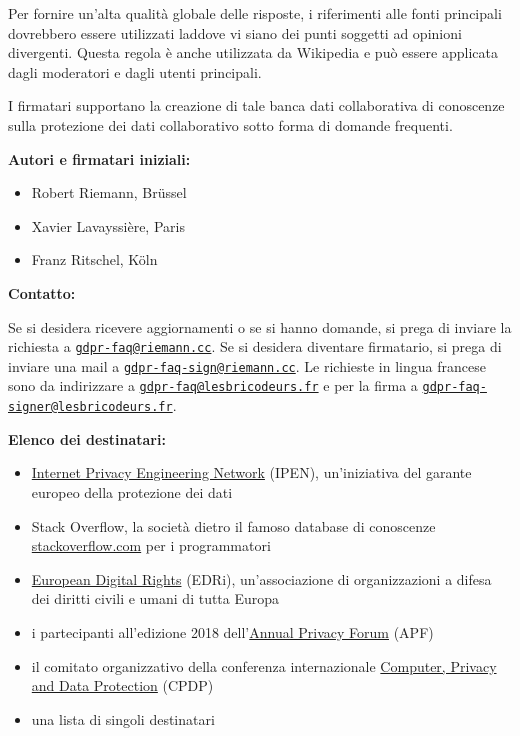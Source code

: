 \documentclass{scrlttr2}
\let\tightlist\relax
\begin{document}
\begin{letter}{}
Per fornire un'alta qualità globale delle risposte, i riferimenti alle
fonti principali dovrebbero essere utilizzati laddove vi siano dei punti
soggetti ad opinioni divergenti. Questa regola è anche utilizzata da
Wikipedia e può essere applicata dagli moderatori e dagli utenti
principali.

I firmatari supportano la creazione di tale banca dati collaborativa di
conoscenze sulla protezione dei dati collaborativo sotto forma di
domande frequenti.

\textbf{Autori e firmatari iniziali:}

\begin{itemize}
\tightlist
\item
  Robert Riemann, Brüssel
\item
  Xavier Lavayssière, Paris
\item
  Franz Ritschel, Köln
\end{itemize}

\textbf{Contatto:}

Se si desidera ricevere aggiornamenti o se si hanno domande, si prega di
inviare la richiesta a
\href{mailto:gdpr-faq@riemann.cc}{\nolinkurl{gdpr-faq@riemann.cc}}. Se
si desidera diventare firmatario, si prega di inviare una mail a
\href{mailto:gdpr-faq-sign@riemann.cc}{\nolinkurl{gdpr-faq-sign@riemann.cc}}.
Le richieste in lingua francese sono da indirizzare a
\href{mailto:gdpr-faq@lesbricodeurs.fr}{\nolinkurl{gdpr-faq@lesbricodeurs.fr}}
e per la firma a
\href{mailto:gdpr-faq-signer@lesbricodeurs.fr}{\nolinkurl{gdpr-faq-signer@lesbricodeurs.fr}}.

\newpage

\textbf{Elenco dei destinatari:}

\begin{itemize}
\tightlist
\item
  \href{https://edps.europa.eu/data-protection/ipen-internet-privacy-engineering-network_en}{Internet
  Privacy Engineering Network} (IPEN), un'iniziativa del garante europeo
  della protezione dei dati
\item
  Stack Overflow, la società dietro il famoso database di conoscenze
  \href{https://stackoverflow.com}{stackoverflow.com} per i
  programmatori
\item
  \href{https://edri.org/}{European Digital Rights} (EDRi),
  un'associazione di organizzazioni a difesa dei diritti civili e umani
  di tutta Europa
\item
  i partecipanti all'edizione 2018
  dell'\href{http://privacyforum.eu/}{Annual Privacy Forum} (APF)
\item
  il comitato organizzativo della conferenza internazionale
  \href{http://www.cpdpconferences.org/}{Computer, Privacy and Data
  Protection} (CPDP)
\item
  una lista di singoli destinatari
\end{itemize}

\end{letter}
\end{document}
